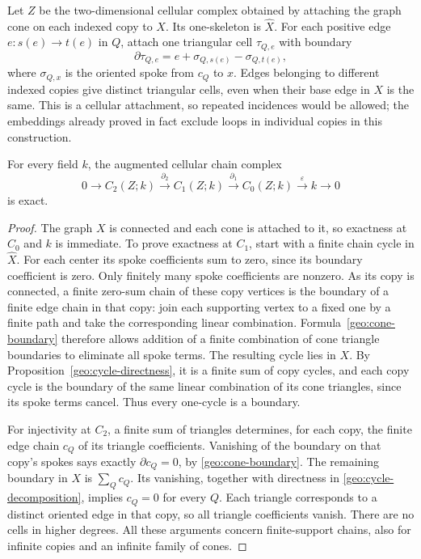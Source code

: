 Let $Z$ be the two-dimensional cellular complex obtained by attaching the
graph cone on each indexed copy to $X$.  Its one-skeleton is $\widehat X$.
For each positive edge $e:s(e)\to t(e)$ in $Q$, attach one triangular
cell $\tau_{Q,e}$ with boundary
\begin{equation}
 \partial\tau_{Q,e}=e+\sigma_{Q,s(e)}-\sigma_{Q,t(e)},
 \label{geo:cone-boundary}
\end{equation}
where $\sigma_{Q,x}$ is the oriented spoke from $c_Q$ to $x$.  Edges
belonging to different indexed copies give distinct triangular cells,
even when their base edge in $X$ is the same.  This is a cellular
attachment, so repeated incidences would be allowed; the embeddings
already proved in fact exclude loops in individual copies in this
construction.

\begin{lemma}
\label{geo:acyclic}
For every field $k$, the augmented cellular chain complex
\begin{equation}
 0\longrightarrow C_2(Z;k)\xrightarrow{\partial_2}C_1(Z;k)
 \xrightarrow{\partial_1}C_0(Z;k)\xrightarrow{\varepsilon}k
 \longrightarrow0
 \label{geo:acyclic-complex}
\end{equation}
is exact.
\end{lemma}

\begin{proof}
The graph $X$ is connected and each cone is attached to it, so exactness
at $C_0$ and $k$ is immediate.  To prove exactness at $C_1$, start with
a finite chain cycle in $\widehat X$.  For each center its spoke
coefficients sum to zero, since its boundary coefficient is zero.  Only
finitely many spoke coefficients are nonzero.  As its copy is connected,
a finite zero-sum chain of these copy vertices is the boundary of a
finite edge chain in that copy: join each supporting vertex to a fixed
one by a finite path and take the corresponding linear combination.
Formula~\eqref{geo:cone-boundary} therefore allows addition of a finite
combination of cone triangle boundaries to eliminate all spoke terms.
The resulting cycle lies in $X$.  By
Proposition~\ref{geo:cycle-directness}, it is a finite sum of copy cycles,
and each copy cycle is the boundary of the same linear combination of
its cone triangles, since its spoke terms cancel.  Thus every one-cycle
is a boundary.

For injectivity at $C_2$, a finite sum of triangles determines, for each
copy, the finite edge chain $c_Q$ of its triangle coefficients.  Vanishing
of the boundary on that copy's spokes says exactly $\partial c_Q=0$,
by \eqref{geo:cone-boundary}.  The remaining boundary in $X$ is
$\sum_Qc_Q$.  Its vanishing, together with directness in
\eqref{geo:cycle-decomposition}, implies $c_Q=0$ for every $Q$.
Each triangle corresponds to a distinct oriented edge in that copy,
so all triangle coefficients vanish.  There are no cells in higher
degrees.  All these arguments concern finite-support chains, also for
infinite copies and an infinite family of cones.
\end{proof}

